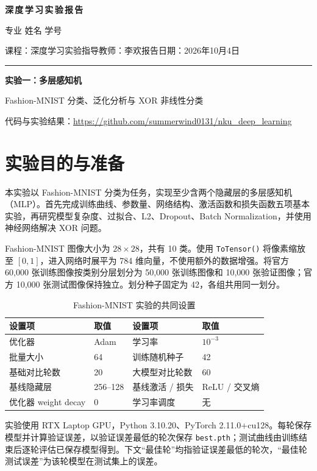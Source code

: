 \documentclass[UTF8,11pt,a4paper,fontset=fandol]{ctexart}
\newcommand{\reportname}{实验一：多层感知机}
\newcommand{\studentname}{史峰源}
\newcommand{\studentnumber}{2412526}
\newcommand{\studentmajor}{智能科学与技术}
\newcommand{\teachername}{李欢}
\begin{document}
\thispagestyle{empty}
\begin{center}
  {\LARGE\bfseries 深\,度\,学\,习\,实\,验\,报\,告}\par\vspace{0.6em}
  专业\underline{\makebox[9em]{\studentmajor}}\quad
  姓名\underline{\makebox[5em]{\studentname}}\quad
  学号\underline{\makebox[6em]{\studentnumber}}\par\vspace{0.35em}
  课程：深度学习实验\qquad 指导教师：\teachername\qquad 报告日期：2026年10月4日\par
  \vspace{0.2em}\rule{\textwidth}{1.2pt}\par\vspace{0.5em}
  {\Large\bfseries\reportname}\par
  {\normalsize Fashion-MNIST 分类、泛化分析与 XOR 非线性分类}
  \par\vspace{0.5em}
  {\small 代码与实验结果：\url{https://github.com/summerwind0131/nku_deep_learning}}
\end{center}

\section{实验目的与准备}
本实验以 Fashion-MNIST 分类为任务，实现至少含两个隐藏层的多层感知机（MLP）。首先完成训练曲线、参数量、网络结构、激活函数和损失函数五项基本实验，再研究模型复杂度、过拟合、L2、Dropout、Batch Normalization，并使用神经网络解决 XOR 问题。

Fashion-MNIST 图像大小为 $28\times28$，共有 10 类。使用 \texttt{ToTensor()} 将像素缩放至 $[0,1]$，进入网络时展平为 784 维向量，不使用额外的数据增强。将官方 60,000 张训练图像按类别分层划分为 50,000 张训练图像和 10,000 张验证图像；官方 10,000 张测试图像保持独立。划分种子固定为 42，各组共用同一划分。

\begin{table}[H]\centering\small
\caption{Fashion-MNIST 实验的共同设置}
\begin{tabular}{llll}\toprule
设置项 & 取值 & 设置项 & 取值 \\\midrule
优化器 & Adam & 学习率 & $10^{-3}$ \\
批量大小 & 64 & 训练随机种子 & 42 \\
基础对比轮数 & 20 & 大模型对比轮数 & 60 \\
基线隐藏层 & 256--128 & 基线激活 / 损失 & ReLU / 交叉熵 \\
优化器 weight decay & 0 & 学习率调度 & 无 \\
\bottomrule\end{tabular}
\end{table}
实验使用 RTX Laptop GPU，Python 3.10.20、PyTorch 2.11.0+cu128。每轮保存模型并计算验证误差，以验证误差最低的轮次保存 \texttt{best.pth}；测试曲线由训练结束后逐轮评估已保存模型得到。下文“最佳轮”均指验证误差最低的轮次，“最佳轮测试误差”为该轮模型在测试集上的误差。
\end{document}

